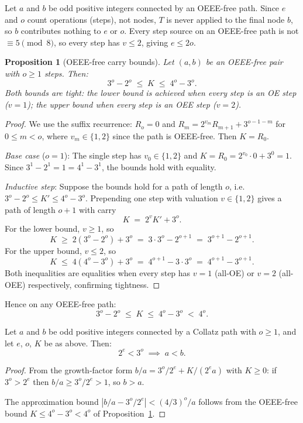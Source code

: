 \documentclass[11pt]{article}
\newtheorem{proposition}{Proposition}
\begin{document}
Let $a$ and $b$ be odd positive integers connected by an OEEE-free path.
Since $e$ and $o$ count operations (steps), not nodes, $T$ is never applied
to the final node $b$, so $b$ contributes nothing to $e$ or $o$.  Every
step source on an OEEE-free path is not $\equiv 5\pmod{8}$, so every step
has $v \leq 2$, giving $e \leq 2o$.

\begin{proposition}[OEEE-free carry bounds]
\label{prop:Kbounds}
Let $(a, b)$ be an OEEE-free pair with $o \geq 1$ steps.  Then:
\[
  3^o - 2^o \;\leq\; K \;\leq\; 4^o - 3^o.
\]
Both bounds are tight: the lower bound is achieved when every step is an OE
step ($v = 1$); the upper bound when every step is an OEE step ($v = 2$).
\end{proposition}

\begin{proof}
We use the suffix recurrence: $R_o = 0$ and $R_m = 2^{v_m} R_{m+1} + 3^{o-1-m}$
for $0 \leq m < o$, where $v_m \in \{1, 2\}$ since the path is OEEE-free.
Then $K = R_0$.

\emph{Base case} ($o = 1$): The single step has $v_0 \in \{1, 2\}$ and
$K = R_0 = 2^{v_0} \cdot 0 + 3^0 = 1$.  Since $3^1 - 2^1 = 1 = 4^1 - 3^1$,
the bounds hold with equality.

\emph{Inductive step}: Suppose the bounds hold for a path of length $o$,
i.e.\ $3^o - 2^o \leq K' \leq 4^o - 3^o$.  Prepending one step with
valuation $v \in \{1, 2\}$ gives a path of length $o + 1$ with carry
\[
  K \;=\; 2^v K' + 3^o.
\]
For the lower bound, $v \geq 1$, so
\[
  K \;\geq\; 2(3^o - 2^o) + 3^o \;=\; 3 \cdot 3^o - 2^{o+1} \;=\; 3^{o+1} - 2^{o+1}.
\]
For the upper bound, $v \leq 2$, so
\[
  K \;\leq\; 4(4^o - 3^o) + 3^o \;=\; 4^{o+1} - 3 \cdot 3^o \;=\; 4^{o+1} - 3^{o+1}.
\]
Both inequalities are equalities when every step has $v = 1$ (all-OE) or
$v = 2$ (all-OEE) respectively, confirming tightness.
\end{proof}

Hence on any OEEE-free path:
\[
  3^o - 2^o \;\leq\; K \;\leq\; 4^o - 3^o \;<\; 4^o.
\]

\begin{theorem}
\label{thm:approx}
Let $a$ and $b$ be odd positive integers connected by a Collatz path
with $o \geq 1$, and let $e$, $o$, $K$ be as above.  Then:
\[
  2^e < 3^o \;\implies\; a < b.
\]
\end{theorem}

\begin{proof}
From the growth-factor form $b/a = 3^o/2^e + K/(2^e a)$ with $K \geq 0$:
if $3^o > 2^e$ then $b/a \geq 3^o/2^e > 1$, so $b > a$.

The approximation bound $|b/a - 3^o/2^e| < (4/3)^o/a$ follows from the
OEEE-free bound $K \leq 4^o - 3^o < 4^o$ of Proposition~\ref{prop:Kbounds}.
\end{proof}
\end{document}
